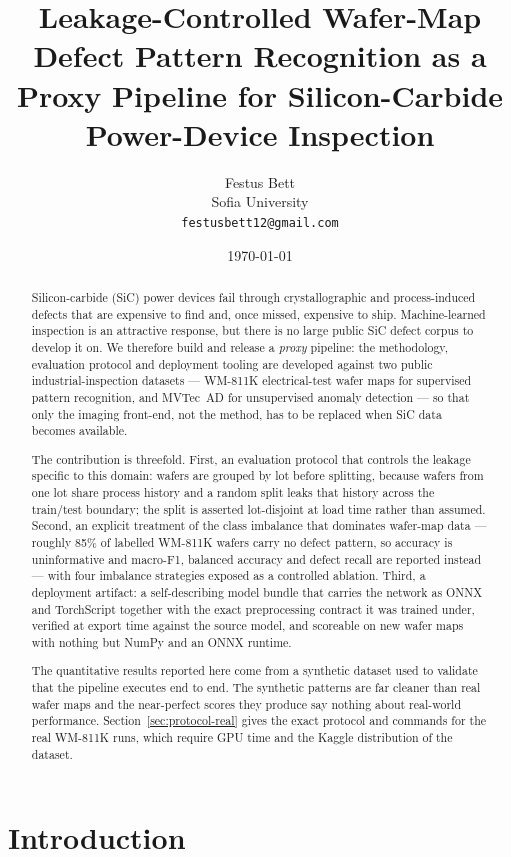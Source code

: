 \documentclass[11pt,a4paper]{article}
\title{Leakage-Controlled Wafer-Map Defect Pattern Recognition as a Proxy
Pipeline for Silicon-Carbide Power-Device Inspection}
\author{Festus Bett\\
\small Sofia University\\
\small \texttt{festusbett12@gmail.com}}
\date{\today}
\newcommand{\caveat}[1]{\textcolor{red!70!black}{#1}}
\begin{document}
\maketitle

\begin{abstract}
Silicon-carbide (SiC) power devices fail through crystallographic and
process-induced defects that are expensive to find and, once missed, expensive
to ship. Machine-learned inspection is an attractive response, but there is no
large public SiC defect corpus to develop it on. We therefore build and release
a \emph{proxy} pipeline: the methodology, evaluation protocol and deployment
tooling are developed against two public industrial-inspection datasets ---
WM-811K electrical-test wafer maps for supervised pattern recognition, and
MVTec~AD for unsupervised anomaly detection --- so that only the imaging
front-end, not the method, has to be replaced when SiC data becomes available.

The contribution is threefold. First, an evaluation protocol that controls the
leakage specific to this domain: wafers are grouped by lot before splitting,
because wafers from one lot share process history and a random split leaks that
history across the train/test boundary; the split is asserted lot-disjoint at
load time rather than assumed. Second, an explicit treatment of the class
imbalance that dominates wafer-map data --- roughly 85\% of labelled WM-811K
wafers carry no defect pattern, so accuracy is uninformative and macro-F1,
balanced accuracy and defect recall are reported instead --- with four
imbalance strategies exposed as a controlled ablation. Third, a deployment
artifact: a self-describing model bundle that carries the network as ONNX and
TorchScript together with the exact preprocessing contract it was trained
under, verified at export time against the source model, and scoreable on new
wafer maps with nothing but NumPy and an ONNX runtime.

\caveat{The quantitative results reported here come from a synthetic dataset
used to validate that the pipeline executes end to end. The synthetic patterns
are far cleaner than real wafer maps and the near-perfect scores they produce
say nothing about real-world performance.} Section~\ref{sec:protocol-real}
gives the exact protocol and commands for the real WM-811K runs, which require
GPU time and the Kaggle distribution of the dataset.
\end{abstract}

\section{Introduction}
\end{document}
